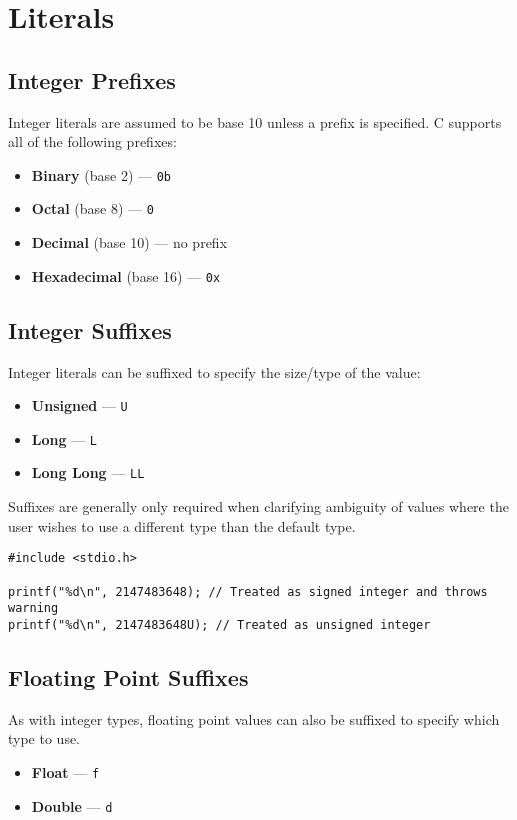 \documentclass[a4paper]{report}
\begin{document}
\chapter{Literals}
\section{Integer Prefixes}
Integer literals are assumed to be base 10 unless a prefix is
specified. C supports all of the following prefixes:
\begin{itemize}
    \item \textbf{Binary} (base 2) --- \texttt{0b}
    \item \textbf{Octal} (base 8) --- \texttt{0}
    \item \textbf{Decimal} (base 10) --- no prefix
    \item \textbf{Hexadecimal} (base 16) --- \texttt{0x}
\end{itemize}
\section{Integer Suffixes}
Integer literals can be suffixed to specify the size/type of the value:
\begin{itemize}
    \item \textbf{Unsigned} --- \texttt{U}
    \item \textbf{Long} --- \texttt{L}
    \item \textbf{Long Long} --- \texttt{LL}
\end{itemize}
Suffixes are generally only required when clarifying ambiguity of values where the user wishes to use a different type than the default type.
\begin{verbatim}
#include <stdio.h>

printf("%d\n", 2147483648); // Treated as signed integer and throws warning
printf("%d\n", 2147483648U); // Treated as unsigned integer
\end{verbatim}
\section{Floating Point Suffixes}
As with integer types, floating point values can also be suffixed to
specify which type to use.
\begin{itemize}
    \item \textbf{Float} --- \texttt{f}
    \item \textbf{Double} --- \texttt{d}
\end{itemize}
\end{document}
